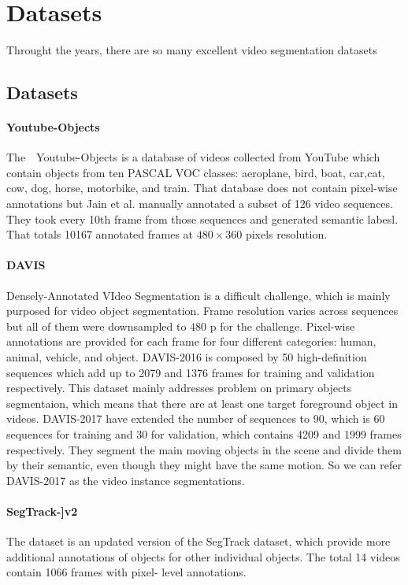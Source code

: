 \section{Datasets}
Throught the years,  there are so many excellent video segmentation datasets
\subsection{Datasets}
\paragraph{Youtube-Objects~\cite{prest2012learning}} 
The　Youtube-Objects is a database of videos collected from YouTube which contain objects from ten PASCAL VOC classes: 
aeroplane, bird, boat, car,cat, cow, dog, horse, motorbike, and train.
 That database does not contain pixel-wise annotations but Jain et al. 
\cite{tang2013discriminative} manually annotated a subset of 126 video sequences.
They took every 10th frame from those sequences and generated semantic labesl. 
That totals 10167 annotated frames at $480\times 360$ pixels resolution.

\paragraph{DAVIS~\cite{Perazzi2016,PontTuset2017,ponttuset2018}}

Densely-Annotated VIdeo Segmentation is a  difficult challenge, which is mainly purposed for video object segmentation.
Frame resolution varies across sequences but all of them were downsampled to 480 p for the challenge. 
Pixel-wise annotations are provided for each frame for four different categories: human, animal, vehicle, and object.
DAVIS-2016 \cite{Perazzi2016Benchmark}is composed by 50 high-definition sequences which add up to 2079 and 1376 frames for training and validation respectively.
This dataset mainly addresses problem on primary objects segmentaion, which means that there are at least one target foreground object in videos.
DAVIS-2017 \cite{PontTuset2017} have extended the number of sequences to 90, which is 60 sequences for training and 30 for validation, which contains 4209 and 1999 frames respectively.
They segment the main moving objects in the scene and divide them by their semantic, even though they might have the same motion. So we can refer DAVIS-2017 as the video instance segmentations.


\paragraph{SegTrack-]v2~\cite{li2013video}}
The dataset is an updated version of the SegTrack dataset, which provide more additional
annotations of objects for other individual objects. The total 14 videos contain 1066 frames with pixel-
level annotations. 


